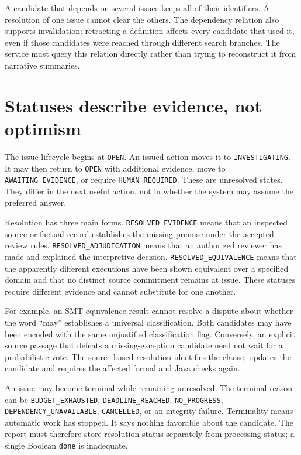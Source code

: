 A candidate that depends on several issues keeps all of their identifiers. A
resolution of one issue cannot clear the others. The dependency relation also
supports invalidation: retracting a definition affects every candidate that used
it, even if those candidates were reached through different search branches.
The service must query this relation directly rather than trying to reconstruct
it from narrative summaries.

\section{Statuses describe evidence, not optimism}

The issue lifecycle begins at \texttt{OPEN}. An issued action moves it to
\texttt{INVESTIGATING}. It may then return to \texttt{OPEN} with additional evidence,
move to \texttt{AWAITING\_EVIDENCE}, or require \texttt{HUMAN\_REQUIRED}. These are
unresolved states. They differ in the next useful action, not in whether the
system may assume the preferred answer.

Resolution has three main forms. \texttt{RESOLVED\_EVIDENCE} means that an inspected
source or factual record establishes the missing premise under the accepted
review rules. \texttt{RESOLVED\_ADJUDICATION} means that an authorized reviewer has
made and explained the interpretive decision. \texttt{RESOLVED\_EQUIVALENCE} means
that the apparently different executions have been shown equivalent over a
specified domain and that no distinct source commitment remains at issue.
These statuses require different evidence and cannot substitute for one another.

For example, an SMT equivalence result cannot resolve a dispute about whether the
word ``may'' establishes a universal classification. Both candidates may have
been encoded with the same unjustified classification flag. Conversely, an
explicit source passage that defeats a missing-exception candidate need not wait
for a probabilistic vote. The source-based resolution identifies the clause,
updates the candidate and requires the affected formal and Java checks again.

An issue may become terminal while remaining unresolved. The terminal reason can
be \texttt{BUDGET\_EXHAUSTED}, \texttt{DEADLINE\_REACHED}, \texttt{NO\_PROGRESS},
\texttt{DEPENDENCY\_UNAVAILABLE}, \texttt{CANCELLED}, or an integrity failure.
Terminality means automatic work has stopped. It says nothing favorable about
the candidate. The report must therefore store resolution status separately from
processing status; a single Boolean \texttt{done} is inadequate.

